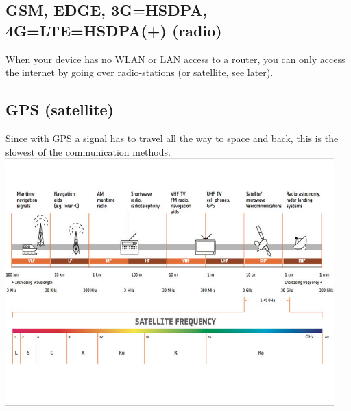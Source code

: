 \subsection{GSM, EDGE, 3G=HSDPA, 4G=LTE=HSDPA(+) (radio)}
When your device has no WLAN or LAN access to a router, you can only access the internet by going over radio-stations (or satellite, see later). 


\subsection{GPS (satellite)}
Since with GPS a signal has to travel all the way to space and back, this is the slowest of the communication methods. 
\includegraphics[width=0.95\textwidth]{images/satellite_frequency_bands.jpg}

